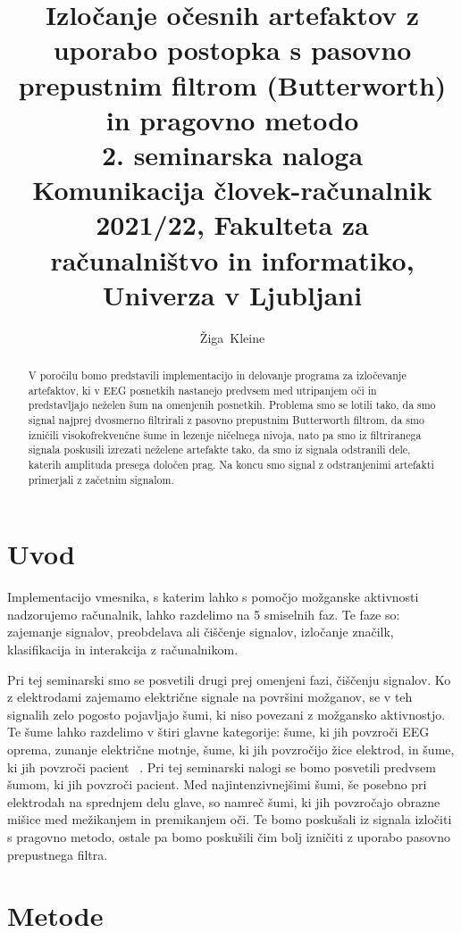 \documentclass[9pt]{IEEEtran}
\title{\vspace{0ex} %
Izločanje očesnih artefaktov z uporabo postopka s
pasovno prepustnim filtrom (Butterworth) in
pragovno metodo
\\ \large{2. seminarska naloga}\\ \normalsize{Komunikacija človek-računalnik 2021/22, Fakulteta za računalništvo in informatiko, Univerza v Ljubljani}}
\author{ %
Žiga~Kleine
\vspace{-4.0ex}
}
\begin{document}
\maketitle

\begin{abstract}

V poročilu bomo predstavili implementacijo in delovanje programa za izločevanje artefaktov, ki v EEG posnetkih nastanejo predvsem med utripanjem oči in predstavljajo neželen šum na omenjenih posnetkih. Problema smo se lotili tako, da smo signal najprej dvosmerno filtrirali z pasovno prepustnim Butterworth filtrom, da smo izničili visokofrekvenčne šume in lezenje ničelnega nivoja, nato pa smo iz filtriranega signala poskusili izrezati neželene artefakte tako, da smo iz signala odstranili dele, katerih amplituda presega določen prag. Na koncu smo signal z odstranjenimi artefakti primerjali z začetnim signalom.


\end{abstract}

\section{Uvod}

Implementacijo vmesnika, s katerim lahko s pomočjo možganske aktivnosti nadzorujemo računalnik, lahko razdelimo na 5 smiselnih faz. Te faze so: zajemanje signalov, preobdelava ali čiščenje signalov, izločanje značilk, klasifikacija in interakcija z računalnikom.

Pri tej seminarski smo se posvetili drugi prej omenjeni fazi, čiščenju signalov. Ko z elektrodami zajemamo električne signale na površini možganov, se v teh signalih zelo pogosto pojavljajo šumi, ki niso povezani z možgansko aktivnostjo. Te šume lahko razdelimo v štiri glavne kategorije: šume, ki jih povzroči EEG oprema, zunanje električne motnje, šume, ki jih povzročijo žice elektrod, in šume, ki jih povzroči pacient ~\cite{gupta1996preprocessing}. Pri tej seminarski nalogi se bomo posvetili predvsem šumom, ki jih povzroči pacient. Med najintenzivnejšimi šumi, še posebno pri elektrodah na sprednjem delu glave, so namreč šumi, ki jih povzročajo obrazne mišice med mežikanjem in premikanjem oči. Te bomo poskušali iz signala izločiti s pragovno metodo, ostale pa bomo poskušili čim bolj izničiti z uporabo pasovno prepustnega filtra.

\section{Metode}
\end{document}

